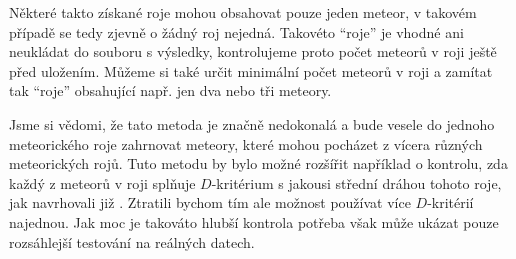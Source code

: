 \smallskip

Některé takto získané roje mohou obsahovat pouze jeden meteor, v takovém případě se tedy zjevně o žádný roj nejedná. Takovéto "`roje"' je vhodné ani neukládat do souboru s výsledky, kontrolujeme proto počet meteorů v roji ještě před uložením. Můžeme si také určit minimální počet meteorů v roji a zamítat tak "`roje"' obsahující např. jen dva nebo tři meteory.

\medskip

Jsme si vědomi, že tato metoda je značně nedokonalá a bude vesele do jednoho meteorického roje zahrnovat meteory, které mohou pocházet z vícera různých meteorických rojů. Tuto metodu by bylo možné rozšířit například o kontrolu, zda každý z meteorů v roji splňuje $D$-kritérium s jakousi střední dráhou tohoto roje, jak navrhovali již \citeauthor{dsh} \cite{dsh}. Ztratili bychom tím ale možnost používat více $D$-kritérií najednou. Jak moc je takováto hlubší kontrola potřeba však může ukázat pouze rozsáhlejší testování na reálných datech.